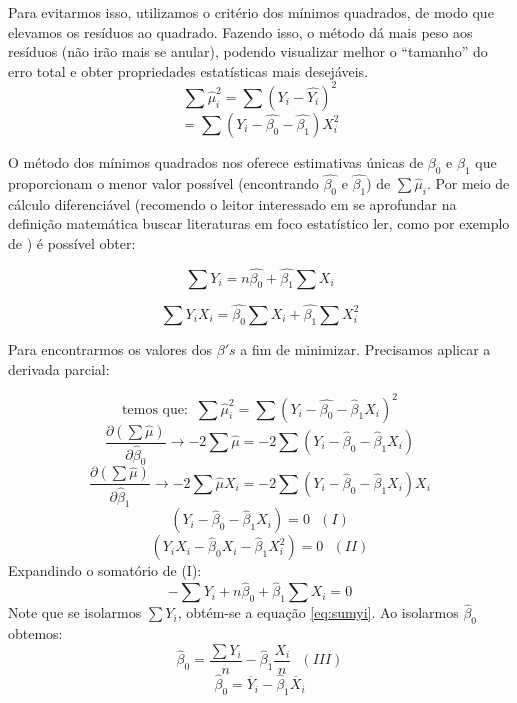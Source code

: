 \documentclass[
  openany]{book}
\begin{document}
Para evitarmos isso, utilizamos o critério dos mínimos quadrados, de modo que elevamos os resíduos ao quadrado. Fazendo isso, o método dá mais peso aos resíduos (não irão mais se anular), podendo visualizar melhor o ``tamanho'' do erro total e obter propriedades estatísticas mais desejáveis.
\[\sum \hat{\mu}^2_i=\sum(Y_i-\hat{Y_i})^2 \]
\begin{equation}
    = \sum (Y_i-\hat{\beta_0}-\hat{\beta_1})X_i^2 
    \label{eq:mmqeq}
\end{equation}

O método dos mínimos quadrados nos oferece estimativas únicas de \(\beta_0\) e \(\beta_1\) que proporcionam o menor valor possível (encontrando \(\hat{\beta_0}\) e \(\hat{\beta_1}\)) de \(\sum \hat{\mu}_i\). Por meio de cálculo diferenciável (recomendo o leitor interessado em se aprofundar na definição matemática buscar literaturas em foco estatístico ler, como por exemplo de \citet{gujarati2011econometria}) é possível obter:

\begin{equation}
    \sum Y_i=n\hat{\beta_0} + \hat{\beta_1} \sum X_i
    \label{eq:sumyi}
\end{equation}

\begin{equation}
    \sum Y_i X_i=\hat{\beta_0} \sum X_i + \hat{\beta_1} \sum X_i^2
    \label{eq:sumyixi}
\end{equation}

Para encontrarmos os valores dos \(\beta's\) a fim de minimizar. Precisamos aplicar a derivada parcial:

\[\mbox{temos que:  }\ \sum\hat{\mu}_i^2=\sum(Y_i-\hat{\beta_0}-\hat{\beta}_1X_i)^2\]
\[\frac{\partial(\sum\hat{\mu})}{\partial \hat{\beta}_0}\rightarrow-2\sum\hat{\mu}=-2\sum(Y_i-\hat{\beta}_0-\hat{\beta}_1X_i)\]
\[\frac{\partial(\sum\hat{\mu})}{\partial \hat{\beta}_1}\rightarrow-2\sum\hat{\mu}X_i=-2\sum(Y_i-\hat{\beta}_0-\hat{\beta}_1X_i)X_i\]
\[(Y_i-\hat{\beta}_0-\hat{\beta}_1X_i)=0 \ \ \ (I)\]
\[(Y_i X_i-\hat{\beta}_0X_i-\hat{\beta}_1X_i^2)=0 \ \ \ (II)\]
Expandindo o somatório de (I):
\[-\sum Y_i+ n\hat{\beta}_0+\hat{\beta}_1\sum X_i=0\]
Note que se isolarmos \(\sum Y_i\), obtém-se a equação \eqref{eq:sumyi}. Ao isolarmos \(\hat{\beta}_0\) obtemos:
\[\hat{\beta}_0=\frac{\sum Y_i}{n}-\hat{\beta}_1\frac{X_i}{n} \ \ \ (III)\]
\begin{equation}
\hat{\beta}_0=\overline{Y}_i-\hat{\beta}_1\overline{X}_i
\label{eq:betazero}
\end{equation}
\end{document}
